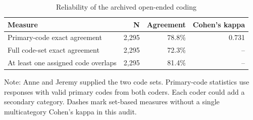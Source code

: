 \begin{table}[H]
\centering
\caption{\label{tab:open-ended-reliability}Reliability of the archived open-ended coding}
\centering
\fontsize{9}{11}\selectfont
\begin{threeparttable}
\begin{tabular}[t]{lrrr}
\toprule
Measure & N & Agreement & Cohen's kappa\\
\midrule
Primary-code exact agreement & 2,295 & 78.8\% & 0.731\\
Full code-set exact agreement & 2,295 & 72.3\% & --\\
At least one assigned code overlaps & 2,295 & 81.4\% & --\\
\bottomrule
\end{tabular}
\begin{tablenotes}[para]
\item Note: Anne and Jeremy supplied the two code sets. Primary-code statistics use responses with valid primary codes from both coders. Each coder could add a secondary category. Dashes mark set-based measures without a single multicategory Cohen's kappa in this audit.
\end{tablenotes}
\end{threeparttable}
\end{table}
